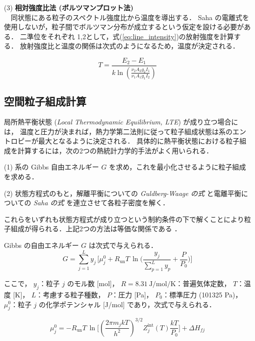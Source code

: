 \documentclass[dvipdfmx,report,uplatex]{jsbook}
\numberwithin{equation}{section}
\numberwithin{figure}{section}
\numberwithin{table}{section}
\begin{document}
(3) \textbf{相対強度比法 (ボルツマンプロット法)}  \\
　同状態にある粒子のスペクトル強度比から温度を導出する．  
Saha の電離式を使用しないが，粒子間でボルツマン分布が成立するという仮定を設ける必要がある．  
二準位をそれぞれ 1,2として，式(\ref{eq:line_intensity})の放射強度を計算する．  
放射強度比と温度の関係は次式のようになるため，温度が決定される\cite{平岡和雄1996各種分光法によるアークプラズマの温度評価}．

\begin{equation}
T
=
\frac{E_2 - E_1}
{k \ln
\left(
\frac{\nu_2 A_2 g_2 I_1}
{\nu_1 A_1 g_1 I_2}
\right)}
\label{eq:boltzmann_ratio}
\end{equation}


\subsection{空間粒子組成計算}
局所熱平衡状態 (\textit{Local Thermodynamic Equilibrium, LTE}) が成り立つ場合には，
温度と圧力が決まれば，熱力学第二法則に従って粒子組成状態は系のエントロピーが最大となるように決定される．  
具体的に熱平衡状態における粒子組成を計算するには，次の2つの熱統計力学的手法がよく用いられる．

(1) 系の Gibbs 自由エネルギー \(G\) を求め，これを最小化させるように粒子組成を求める．  

(2) 状態方程式のもと，解離平衡についての \textit{Guldberg-Waage の式} と電離平衡についての \textit{Saha の式} を連立させて各粒子密度を解く．

これらをいずれも状態方程式が成り立つという制約条件の下で解くことにより粒子組成が得られる．上記2つの方法は等価な関係である \cite{1520853832517707008}．

Gibbs の自由エネルギー \(G\) は次式で与えられる．
\begin{equation}
G = \sum_{j=1}^{L} y_j \, 
\Biggl[
  \mu_j^0 
  + R_\mathrm{un} T \, 
  \ln \Biggl(
    \frac{y_j}{\sum_{p=1}^{L} y_p} 
    + \frac{P}{P_0}
  \Biggr)
\Biggr]
\end{equation}

ここで，  
\(y_j\)：粒子 \(j\) のモル数 [mol]，  
\(R = 8.31~\mathrm{J/mol/K}\)：普遍気体定数，  
\(T\)：温度 [K]，  
\(L\)：考慮する粒子種数，  
\(P\)：圧力 [Pa]，  
\(P_0\)：標準圧力 (101325 Pa)，  
\(\mu_j^0\)：粒子 \(j\) の化学ポテンシャル [J/mol] であり，次式で与えられる．

\begin{equation}
\mu_j^0
= - R_\mathrm{un} T \,
\ln \! \Biggl[
  \left( \frac{2 \pi m_j k T}{h^2} \right)^{3/2} 
  Z_j^\mathrm{int}(T) \frac{k T}{P_0}
\Biggr] 
+ \Delta H_{fj}
\end{equation}
\end{document}
